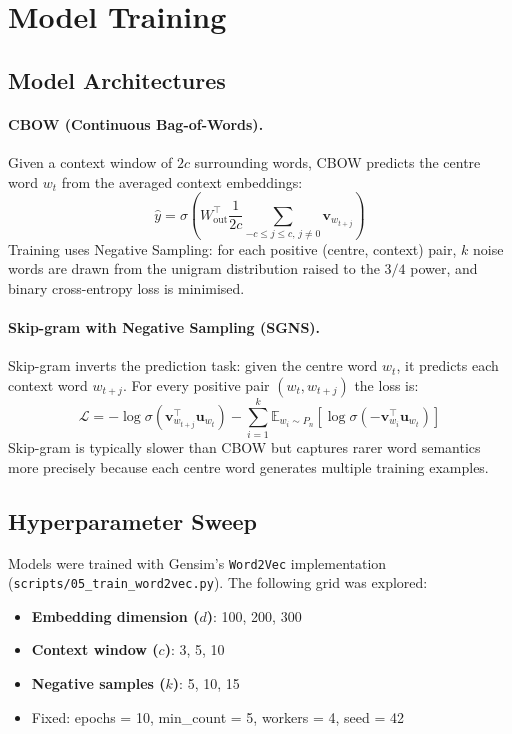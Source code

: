 \documentclass[12pt,a4paper]{article}
\begin{document}
\newpage

\section{Model Training}

\subsection{Model Architectures}

\paragraph{CBOW (Continuous Bag-of-Words).}
Given a context window of $2c$ surrounding words, CBOW predicts the centre
word $w_t$ from the averaged context embeddings:
\[
    \hat{y} = \sigma\!\left(W_{\text{out}}^\top
    \frac{1}{2c}\sum_{-c\le j\le c,\,j\ne 0} \mathbf{v}_{w_{t+j}}\right)
\]
Training uses Negative Sampling: for each positive (centre, context) pair, $k$
noise words are drawn from the unigram distribution raised to the $3/4$ power,
and binary cross-entropy loss is minimised.

\paragraph{Skip-gram with Negative Sampling (SGNS).}
Skip-gram inverts the prediction task: given the centre word $w_t$, it predicts
each context word $w_{t+j}$. For every positive pair $(w_t, w_{t+j})$ the loss is:
\[
    \mathcal{L} = -\log\sigma\!\left(\mathbf{v}_{w_{t+j}}^\top\mathbf{u}_{w_t}\right)
    - \sum_{i=1}^{k} \mathbb{E}_{w_i \sim P_n}\!\left[
      \log\sigma\!\left(-\mathbf{v}_{w_i}^\top\mathbf{u}_{w_t}\right)\right]
\]
Skip-gram is typically slower than CBOW but captures rarer word semantics
more precisely because each centre word generates multiple training examples.

\subsection{Hyperparameter Sweep}

Models were trained with Gensim's \texttt{Word2Vec} implementation
(\texttt{scripts/05\_train\_word2vec.py}). The following grid was explored:

\begin{itemize}[nosep]
    \item \textbf{Embedding dimension ($d$)}: 100, 200, 300
    \item \textbf{Context window ($c$)}: 3, 5, 10
    \item \textbf{Negative samples ($k$)}: 5, 10, 15
    \item Fixed: epochs = 10, min\_count = 5, workers = 4, seed = 42
\end{itemize}
\end{document}
